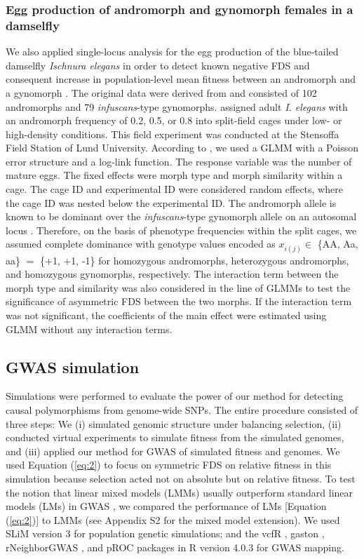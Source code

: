 \documentclass[12pt,]{article}
\begin{document}
\subsubsection{Egg production of andromorph and gynomorph females in a damselfly}
We also applied single-locus analysis for the egg production of the blue-tailed damselfly \textit{Ischnura elegans} in order to detect known negative FDS and consequent increase in population-level mean fitness between an andromorph and a gynomorph \citep{takahashi2014evolution, le2015evolutionary}. The original data were derived from \cite{takahashi2014evolution} and consisted of 102 andromorphs and 79 \textit{infuscans}-type gynomorphs. \cite{takahashi2014evolution} assigned adult \textit{I. elegans} with an andromorph frequency of 0.2, 0.5, or 0.8 into split-field cages under low- or high-density conditions. This field experiment was conducted at the Stensoffa Field Station of Lund University. According to \cite{takahashi2014evolution}, we used a GLMM with a Poisson error structure and a log-link function. The response variable was the number of mature eggs. The fixed effects were morph type and morph similarity within a cage. The cage ID and experimental ID were considered random effects, where the cage ID was nested below the experimental ID. The andromorph allele is known to be dominant over the \textit{infuscans}-type gynomorph allele on an autosomal locus \citep{sanchez2005hybridization}. Therefore, on the basis of phenotype frequencies within the split cages, we assumed complete dominance with genotype values encoded as $x_{i(j)} \in$ \{AA, Aa, aa\} $=$ \{+1, +1, -1\} for homozygous andromorphs, heterozygous andromorphs, and homozygous gynomorphs, respectively. The interaction term between the morph type and similarity was also considered in the line of GLMMs to test the significance of asymmetric FDS between the two morphs. If the interaction term was not significant, the coefficients of the main effect were estimated using GLMM without any interaction terms.


\subsection{GWAS simulation}
Simulations were performed to evaluate the power of our method for detecting causal polymorphisms from genome-wide SNPs. The entire procedure consisted of three steps: We (i) simulated genomic structure under balancing selection, (ii) conducted virtual experiments to simulate fitness from the simulated genomes, and (iii) applied our method for GWAS of simulated fitness and genomes. We used Equation (\ref{eq:2}) to focus on symmetric FDS on relative fitness in this simulation because selection acted not on absolute but on relative fitness. To test the notion that linear mixed models (LMMs) usually outperform standard linear models (LMs) in GWAS \citep{kang2008efficient}, we compared the performance of LMs [Equation (\ref{eq:2})] to LMMs (see Appendix S2 for the mixed model extension). We used SLiM version 3 \citep{haller_slim_2019} for population genetic simulations; and the vcfR \citep{knaus2017vcfr}, gaston \citep{R_gaston}, rNeighborGWAS \citep{sato2019neighbor}, and pROC \citep{R_pROC} packages in R version 4.0.3 \citep{R_citation} for GWAS mapping.
\end{document}
